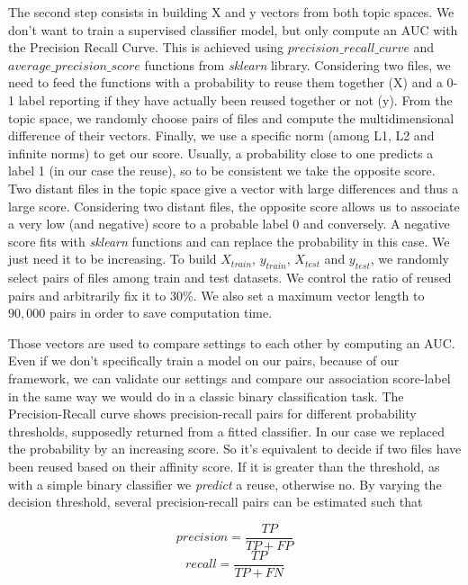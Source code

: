 \documentclass[a4paper]{article}
\begin{document}
	The second step consists in building X and y vectors from both topic spaces. We don't want to train a supervised classifier model, but only compute an \ac{AUC} with the Precision Recall Curve. This is achieved using \emph{$precision\_recall\_curve$} and \emph{$average\_precision\_score$} functions from \emph{sklearn} library. Considering two files, we need to feed the functions with a probability to reuse them together (X) and a 0-1 label reporting if they have actually been reused together or not (y). From the topic space, we randomly choose pairs of files and compute the multidimensional difference of their vectors. Finally, we use a specific norm (among L1, L2 and infinite norms) to get our score. Usually, a probability close to one predicts a label 1 (in our case the reuse), so to be consistent we take the opposite score. Two distant files in the topic space give a vector with large differences and thus a large score. Considering two distant files, the opposite score allows us to associate a very low (and negative) score to a probable label 0 and conversely. A negative score fits with \emph{sklearn} functions and can replace the probability in this case. We just need it to be increasing. To build $X_{train}$, $y_{train}$, $X_{test}$ and $y_{test}$, we randomly select pairs of files among train and test datasets. We control the ratio of reused pairs and arbitrarily fix it to 30\%. We also set a maximum vector length to $90,000$ pairs in order to save computation time. 
	
	Those vectors are used to compare settings to each other by computing an \ac{AUC}. Even if we don't specifically train a model on our pairs, because of our framework, we can validate our settings and compare our association score-label in the same way we would do in a classic binary classification task.
	The Precision-Recall curve shows precision-recall pairs for different probability thresholds, supposedly returned from a fitted classifier. In our case we replaced the probability by an increasing score. So it's equivalent to decide if two files have been reused based on their affinity score. If it is greater than the threshold, as with a simple binary classifier we \textit{predict} a reuse, otherwise no. By varying the decision threshold, several precision-recall pairs can be estimated such that
	
	\[
	precision = \frac{TP}{TP + FP}
	\]
	\[
	recall = \frac{TP}{TP + FN}
	\]
	
\end{document}
